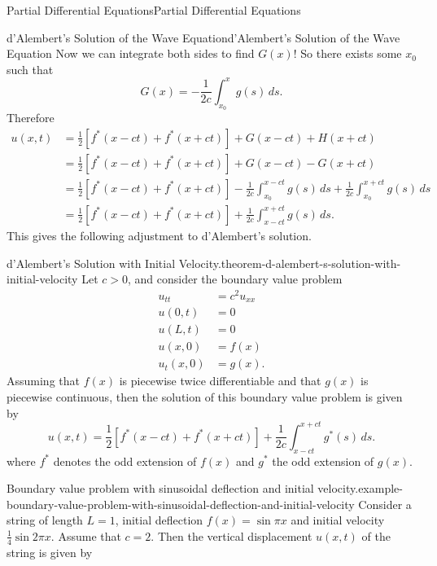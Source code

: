 \documentclass[10pt,]{book}
\numberwithin{equation}{section}
\newcommand{\gt}{>}
\begin{document}
\begin{chapterptx}{Partial Differential Equations}{}{Partial Differential Equations}{}{}
\begin{sectionptx}{d'Alembert's Solution of the Wave Equation}{}{d'Alembert's Solution of the Wave Equation}{}{}
\hypertarget{p-498}{}%
Now we can integrate both sides to find \(G(x)\)! So there exists some \(x_{0}\) such that%
%
\begin{equation*}
G(x) = -\frac{1}{2c}\int_{x_{0}}^{x}g(s)\,ds.
\end{equation*}
\hypertarget{p-499}{}%
Therefore%
%
\begin{align*}
u(x,t) & = \frac{1}{2}[f^{*}(x-ct)+f^{*}(x+ct)] + G(x-ct) + H(x+ct) \\
& = \frac{1}{2}[f^{*}(x-ct)+f^{*}(x+ct)] + G(x-ct) - G(x+ct) \\
& = \frac{1}{2}[f^{*}(x-ct)+f^{*}(x+ct)] - \frac{1}{2c}\int_{x_{0}}^{x-ct}g(s)\,ds + \frac{1}{2c}\int_{x_{0}}^{x+ct}g(s)\,ds \\
& = \frac{1}{2}[f^{*}(x-ct)+f^{*}(x+ct)] + \frac{1}{2c}\int_{x-ct}^{x+ct}g(s)\,ds. 
\end{align*}
\hypertarget{p-500}{}%
This gives the following adjustment to d'Alembert's solution.%
\begin{theorem}{d'Alembert's Solution with Initial Velocity.}{}{theorem-d-alembert-s-solution-with-initial-velocity}%
\hypertarget{p-501}{}%
Let \(c\gt0\), and consider the boundary value problem%
%
\begin{align*}
u_{tt} & = c^{2}u_{xx} \\
u(0,t) & = 0 \\
u(L,t) & = 0 \\
u(x,0) & = f(x) \\
u_{t}(x,0) & = g(x). 
\end{align*}
\hypertarget{p-502}{}%
Assuming that \(f(x)\) is piecewise twice differentiable and that \(g(x)\) is piecewise continuous, then the solution of this boundary value problem is given by%
%
\begin{equation*}
u(x,t) = \frac{1}{2}[f^{*}(x-ct)+f^{*}(x+ct)] + \frac{1}{2c}\int_{x-ct}^{x+ct}g^{*}(s)\,ds.
\end{equation*}
\hypertarget{p-503}{}%
where \(f^{*}\) denotes the odd extension of \(f(x)\) and \(g^{*}\) the odd extension of \(g(x)\).%
\end{theorem}
\begin{example}{Boundary value problem with sinusoidal deflection and initial velocity.}{example-boundary-value-problem-with-sinusoidal-deflection-and-initial-velocity}%
\hypertarget{p-504}{}%
Consider a string of length \(L=1\), initial deflection \(f(x) = \sin\pi x\) and initial velocity \(\frac{1}{4}\sin2\pi x\). Assume that \(c = 2\). Then the vertical displacement \(u(x,t)\) of the string is given by%

\end{example}
\end{sectionptx}
\end{chapterptx}
\end{document}
